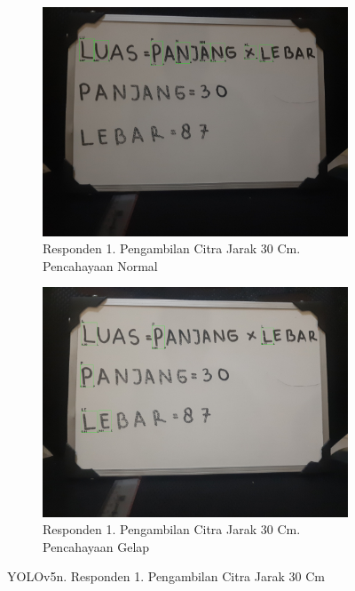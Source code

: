 \begin{figure}[H]
  \begin{subfigure}{.5\textwidth}
    \centering
    \captionsetup{width=.8\linewidth}
    \includegraphics[width=.8\linewidth]{gambar/yolov5n/responden1/dinda30cm00-result.jpg}
    \caption{Responden 1. Pengambilan Citra Jarak 30 Cm. Pencahayaan Normal}
    \label{fig:nr1tcitra30cm}
  \end{subfigure}%
  \begin{subfigure}{.5\textwidth}
    \centering
    \captionsetup{width=.8\linewidth}
    \includegraphics[width=.8\linewidth]{gambar/yolov5n/responden1/dinda30cm10-result.jpg}
    \caption{Responden 1. Pengambilan Citra Jarak 30 Cm. Pencahayaan Gelap}
    \label{fig:nr1gcitra30cm}
  \end{subfigure}
  \caption{YOLOv5n. Responden 1. Pengambilan Citra Jarak 30 Cm}
  \label{fig:nr1citra30cm}
\end{figure}

